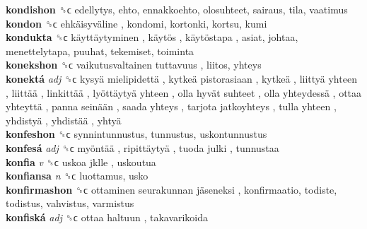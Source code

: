 \textbf{kondishon} ␝ϲ  edellytys, ehto, ennakkoehto, olosuhteet, sairaus, tila, vaatimus  \\
\textbf{kondon} ␝ϲ   ehkäisyväline , kondomi, kortonki, kortsu, kumi  \\
\textbf{kondukta} ␝ϲ   käyttäytyminen ,  käytös ,  käytöstapa , asiat, johtaa, menettelytapa, puuhat, tekemiset, toiminta  \\
\textbf{konekshon} ␝ϲ   vaikutusvaltainen tuttavuus , liitos, yhteys  \\
\textbf{konektá} \emph{adj}  ␝ϲ   kysyä mielipidettä ,  kytkeä pistorasiaan ,  kytkeä ,  liittyä yhteen ,  liittää ,  linkittää ,  lyöttäytyä yhteen ,  olla hyvät suhteet ,  olla yhteydessä ,  ottaa yhteyttä ,  panna seinään ,  saada yhteys ,  tarjota jatkoyhteys ,  tulla yhteen ,  yhdistyä ,  yhdistää ,  yhtyä   \\
\textbf{konfeshon} ␝ϲ  synnintunnustus, tunnustus, uskontunnustus  \\
\textbf{konfesá} \emph{adj}  ␝ϲ   myöntää ,  ripittäytyä ,  tuoda julki , tunnustaa  \\
\textbf{konfia} \emph{v}  ␝ϲ   uskoa jklle , uskoutua  \\
\textbf{konfiansa} \emph{n}  ␝ϲ  luottamus, usko  \\
\textbf{konfirmashon} ␝ϲ   ottaminen seurakunnan jäseneksi , konfirmaatio, todiste, todistus, vahvistus, varmistus  \\
\textbf{konfiská} \emph{adj}  ␝ϲ   ottaa haltuun , takavarikoida  \\
